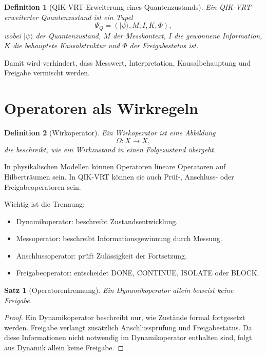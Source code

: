 \documentclass[11pt,a4paper,oneside]{scrartcl}
\theoremstyle{qikstyle}
\newtheorem{definition}{Definition}[section]
\newtheorem{satz}{Satz}[section]
\newcommand{\Phiop}{\Phi}
\begin{document}
\begin{definition}[QIK-VRT-Erweiterung eines Quantenzustands]
Ein QIK-VRT-erweiterter Quantenzustand ist ein Tupel
\[
\Psi_Q=(|\psi\rangle, M, I, K, \Phiop),
\]
wobei \(|\psi\rangle\) der Quantenzustand, \(M\) der Messkontext, \(I\) die gewonnene Information, \(K\) die behauptete Kausalstruktur und \(\Phiop\) der Freigabestatus ist.
\end{definition}

Damit wird verhindert, dass Messwert, Interpretation, Kausalbehauptung und Freigabe vermischt werden.
\newpage

\section{Operatoren als Wirkregeln}

\begin{definition}[Wirkoperator]
Ein Wirkoperator ist eine Abbildung
\[
\Omega:X\to X,
\]
die beschreibt, wie ein Wirkzustand in einen Folgezustand übergeht.
\end{definition}

In physikalischen Modellen können Operatoren lineare Operatoren auf Hilberträumen sein. In QIK-VRT können sie auch Prüf-, Anschluss- oder Freigabeoperatoren sein.

Wichtig ist die Trennung:

\begin{itemize}
\item Dynamikoperator: beschreibt Zustandsentwicklung.
\item Messoperator: beschreibt Informationsgewinnung durch Messung.
\item Anschlussoperator: prüft Zulässigkeit der Fortsetzung.
\item Freigabeoperator: entscheidet DONE, CONTINUE, ISOLATE oder BLOCK.
\end{itemize}

\begin{satz}[Operatorentrennung]
Ein Dynamikoperator allein beweist keine Freigabe.
\end{satz}

\begin{proof}
Ein Dynamikoperator beschreibt nur, wie Zustände formal fortgesetzt werden. Freigabe verlangt zusätzlich Anschlussprüfung und Freigabestatus. Da diese Informationen nicht notwendig im Dynamikoperator enthalten sind, folgt aus Dynamik allein keine Freigabe.
\end{proof}
\end{document}

